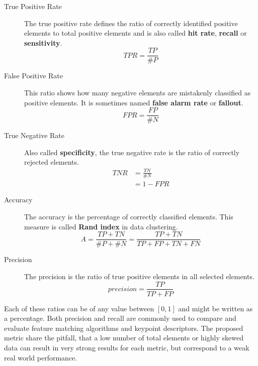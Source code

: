\begin{description}
    \item[True Positive Rate] The true positive rate defines the ratio of correctly identified positive elements to total positive elements and is also called \textbf{hit rate}, \textbf{recall} or \textbf{sensitivity}.
        \begin{equation}
            TPR = \frac{TP}{\#P}
            \label{eq:true_positive_rate}
        \end{equation}
    \item[False Positive Rate] This ratio shows how many negative elements are mistakenly classified as positive elements. It is sometimes named \textbf{false alarm rate} or \textbf{fallout}.
        \begin{equation}
            FPR = \frac{FP}{\#N}
            \label{eq:false_positive_rate}
        \end{equation}
\newpage
    \item[True Negative Rate] Also called \textbf{specificity}, the true negative rate is the ratio of correctly rejected elements.
        \begin{equation}
        \begin{aligned}
            TNR &= \frac{TN}{\#N} \\
                &= 1 - FPR
        \end{aligned}
        \label{eq:true_negative_rate}
        \end{equation}
    \item[Accuracy] The accuracy is the percentage of correctly classified elements. This measure is called \textbf{Rand index} in data clustering.
        \begin{equation}
            A = \frac{TP + TN}{\#P + \#N} = \frac{TP + TN}{TP + FP + TN + FN}
            \label{eq:accuracy}
        \end{equation}
    \item[Precision] The precision is the ratio of true positive elements in all selected elements.
        \begin{equation}
            precision = \frac{TP}{TP + FP}
        \end{equation}
\end{description}
Each of these ratios can be of any value between $[0, 1]$ and might be written as a percentage.
Both precision and recall are commonly used to compare and evaluate feature matching algorithms and keypoint descriptors.
The proposed metric share the pitfall, that a low number of total elements or highly skewed data can result in very strong results for each metric, but correspond to a weak real world performance.

